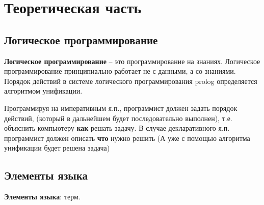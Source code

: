 \documentclass[a4paper,oneside,12pt]{extreport}
\begin{document}


\section*{Теоретическая часть}

\subsection*{Логическое программирование}

\textbf{Логическое программирование} -- это программирование на знаниях. 
Логическое программирование принципиально работает не с данными, а со знаниями.
Порядок действий в системе логического программирования prolog определяется алгоритмом унификации. 

Программируя на императивным я.п., программист должен задать порядок действий,
(который в дальнейшем будет последовательно выполнен), т.е. объяснить компьютеру \textbf{как} решать задачу.
В случае декларативного я.п. программист должен описать \textbf{что} нужно решить (А уже с помощью алгоритма унификации будет решена задача)

\subsection*{Элементы языка}

\textbf{Элементы языка}: терм.
\end{document}
